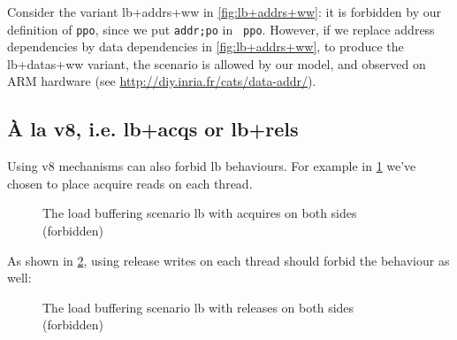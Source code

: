\documentclass[a4paper]{article}
\begin{document}
Consider the variant \textsf{lb+addrs+ww} in \myfig\ref{fig:lb+addrs+ww}: it is
forbidden by our definition of {\tt ppo}, since we put {\tt addr;po} in {\tt
ppo}. However, if we replace address dependencies by data dependencies in
\myfig\ref{fig:lb+addrs+ww}, to produce the \textsf{lb+datas+ww} variant, the
scenario is allowed by our model, and observed on ARM hardware (see
\url{http://diy.inria.fr/cats/data-addr/}).


\subsection{\`A la v8, i.e. {\sf lb+acqs} or {\sf lb+rels}} 

Using v8 mechanisms can also forbid {\sf lb} behaviours. For example in
\myfig\ref{fig:lb-acqs} we've chosen to place acquire reads on each thread. 

\begin{figure}[!h]
\vspace*{-2mm}
\begin{center}
\end{center}
\vspace*{-8mm}
\caption{The load buffering scenario \textsf{lb} with acquires on both sides (forbidden) \label{fig:lb-acqs}}
\vspace*{-2mm}
\end{figure}

As shown in \myfig\ref{fig:lb-rels}, using release writes on each thread should
forbid the behaviour as well:

\begin{figure}[!h]
\vspace*{-2mm}
\begin{center}
\end{center}
\vspace*{-8mm}
\caption{The load buffering scenario \textsf{lb} with releases on both sides (forbidden) \label{fig:lb-rels}}
\vspace*{-2mm}
\end{figure}
\end{document}
